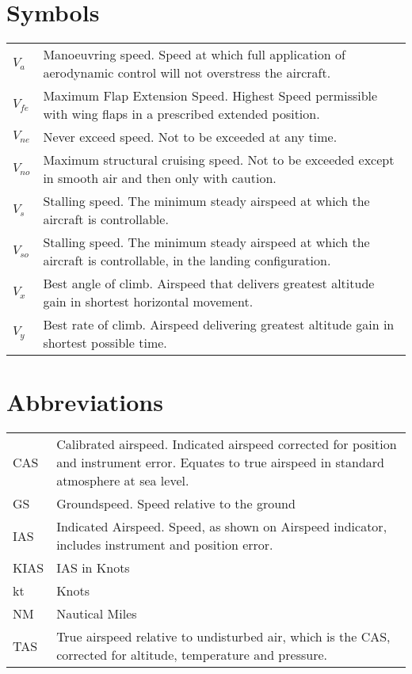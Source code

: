 \section{Symbols}
  \begin{tabularx}{\linewidth}{
    >{\hsize=0.2\hsize}X
    >{\hsize=0.8\hsize}X  }
$V_a$    & Manoeuvring speed. Speed at which full application of aerodynamic control will not overstress the aircraft. \\
$V_{fe}$ & Maximum Flap Extension Speed. Highest Speed permissible with wing flaps in a prescribed extended position. \\
$V_{ne}$ & Never exceed speed. Not to be exceeded at any time. \\
$V_{no}$ & Maximum structural cruising speed. Not to be exceeded except in smooth air and then only with caution.\\ 
$V_{s}$  & Stalling speed. The minimum steady airspeed at which the aircraft is controllable. \\
$V_{so}$ & Stalling speed. The minimum steady airspeed at which the aircraft is controllable, in the landing configuration. \\
$V_x$    & Best angle of climb. Airspeed that delivers greatest altitude gain in shortest horizontal movement. \\
$V_y$    & Best rate of climb. Airspeed delivering greatest altitude gain in shortest possible time.\\
\end{tabularx}

\section{Abbreviations}
  \begin{tabularx}{\linewidth}{
    >{\hsize=0.2\hsize}X
    >{\hsize=0.8\hsize}X  }
CAS & Calibrated airspeed. Indicated airspeed corrected for position and instrument error. Equates to true airspeed in standard atmosphere at sea level. \\
GS & Groundspeed. Speed relative to the ground \\
IAS & Indicated Airspeed. Speed, as shown on Airspeed indicator, includes instrument and position error. \\
KIAS & IAS in Knots \\
kt & Knots \\
NM & Nautical Miles\\
TAS & True airspeed relative to undisturbed air, which is the CAS, corrected for altitude, temperature and pressure. \\
\end{tabularx}

